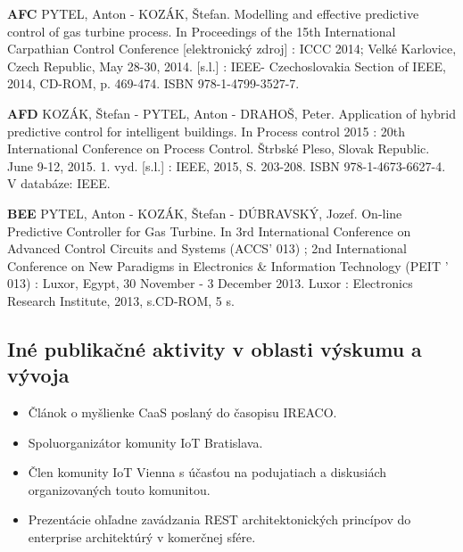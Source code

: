 \begin{enumerate}[label={[\arabic*]}]
  \item \textbf{AFC} PYTEL, Anton - KOZÁK, Štefan. Modelling and effective predictive control of gas turbine process. In Proceedings of the 15th International Carpathian Control Conference [elektronický zdroj] : ICCC 2014; Velké Karlovice, Czech Republic, May 28-30, 2014. [s.l.] : IEEE- Czechoslovakia Section of IEEE, 2014, CD-ROM, p. 469-474. ISBN 978-1-4799-3527-7.
  \item \textbf{AFD} KOZÁK, Štefan - PYTEL, Anton - DRAHOŠ, Peter. Application of hybrid predictive control for intelligent buildings. In Process control 2015 : 20th International Conference on Process Control. Štrbské Pleso, Slovak Republic. June 9-12, 2015. 1. vyd. [s.l.] : IEEE, 2015, S. 203-208. ISBN 978-1-4673-6627-4. V databáze: IEEE.
  \item \textbf{BEE} PYTEL, Anton - KOZÁK, Štefan - DÚBRAVSKÝ, Jozef. On-line Predictive Controller for Gas Turbine. In 3rd International Conference on Advanced Control Circuits and Systems (ACCS' 013) ; 2nd International Conference on New Paradigms in Electronics \& Information Technology (PEIT ' 013) : Luxor, Egypt, 30 November - 3 December 2013. Luxor : Electronics Research Institute, 2013, s.CD-ROM, 5 s.
\end{enumerate}
\subsection*{Iné publikačné aktivity v oblasti výskumu a vývoja}
\begin{itemize}
\item Článok o myšlienke CaaS poslaný do časopisu IREACO.
\item Spoluorganizátor komunity IoT Bratislava.
\item Člen komunity IoT Vienna s účasťou na podujatiach a diskusiách organizovaných touto komunitou.
\item Prezentácie ohľadne zavádzania REST architektonických princípov do enterprise architektúrý v komerčnej sfére.
\end{itemize}